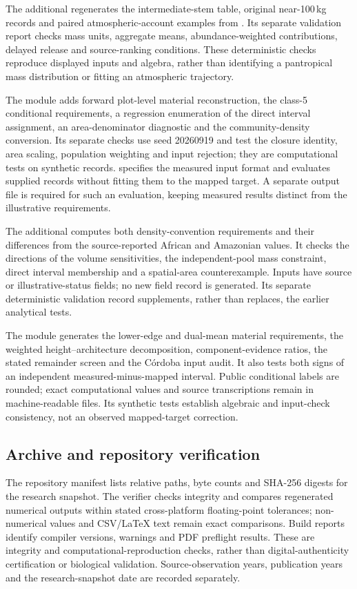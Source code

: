 \documentclass[11pt,a4paper]{article}
\theoremstyle{remark}
\begin{document}
The additional  regenerates the intermediate-stem table, original near-100\,kg records and paired atmospheric-account examples from . Its separate validation report checks mass units, aggregate means, abundance-weighted contributions, delayed release and source-ranking conditions. These deterministic checks reproduce displayed inputs and algebra, rather than identifying a pantropical mass distribution or fitting an atmospheric trajectory.


The module  adds forward plot-level material reconstruction, the class-5 conditional requirements, a regression enumeration of the direct interval assignment, an area-denominator diagnostic and the community-density conversion. Its separate checks use seed 20260919 and test the closure identity, area scaling, population weighting and input rejection; they are computational tests on synthetic records.  specifies the measured input format and  evaluates supplied records without fitting them to the mapped target. A separate output file is required for such an evaluation, keeping measured results distinct from the illustrative requirements.

The additional  computes both density-convention requirements and their differences from the source-reported African and Amazonian values. It checks the directions of the volume sensitivities, the independent-pool mass constraint, direct interval membership and a spatial-area counterexample. Inputs have source or illustrative-status fields; no new field record is generated. Its separate deterministic validation record supplements, rather than replaces, the earlier analytical tests.

The module  generates the lower-edge and dual-mean material requirements, the weighted height--architecture decomposition, component-evidence ratios, the stated remainder screen and the C\'ordoba input audit. It also tests both signs of an independent measured-minus-mapped interval. Public conditional labels are rounded; exact computational values and source transcriptions remain in machine-readable files. Its synthetic tests establish algebraic and input-check consistency, not an observed mapped-target correction.

\subsection{Archive and repository verification}
The repository manifest lists relative paths, byte counts and SHA-256 digests for the research snapshot. The verifier checks integrity and compares regenerated numerical outputs within stated cross-platform floating-point tolerances; non-numerical values and CSV/LaTeX text remain exact comparisons. Build reports identify compiler versions, warnings and PDF preflight results. These are integrity and computational-reproduction checks, rather than digital-authenticity certification or biological validation. Source-observation years, publication years and the research-snapshot date are recorded separately.
\end{document}
